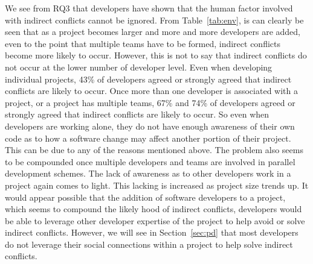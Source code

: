 \documentclass[conference]{IEEEtran}
\begin{document}
We see from RQ3 that developers have shown that the human factor involved with indirect conflicts cannot be ignored.
From Table~\ref{tab:env}, is can clearly be seen that as a project becomes larger and more and more developers are added, even to the point
that multiple teams have to be formed, indirect conflicts become more likely to occur. However, this is not to say that indirect conflicts
do not occur at the lower number of developer level. Even when developing individual projects, 43\% of developers agreed or strongly agreed
that indirect conflicts are likely to occur. Once more than one developer is associated with a project, or a project has multiple teams, 
67\% and 74\% of developers agreed or strongly agreed that indirect conflicts are likely to occur. So even when developers are working alone,
they do not have enough awareness of their own code as to how a software change may affect another portion of their project. This can be due to
any of the reasons mentioned above. The problem also seems to be compounded once multiple developers and teams are involved in parallel development
schemes. The lack of awareness as to other developers work in a project again comes to light. This lacking is increased as project size trends up.
It would appear possible that the addition of software developers to a project, which seems to compound the likely hood of indirect
conflicts, developers would be able to leverage other developer expertise of the project to help avoid or solve indirect conflicts.
However, we will see in Section~\ref{sec:pd} that most developers do not leverage their social connections within a project to help
solve indirect conflicts.
\end{document}
